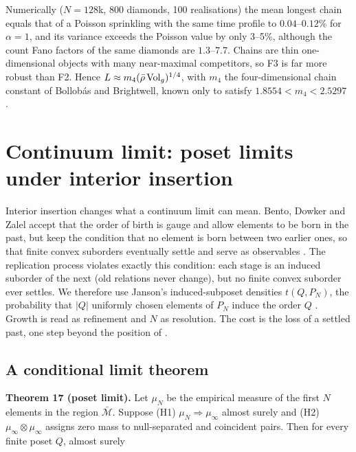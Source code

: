 Numerically (\(N=128\)k, 800 diamonds, 100 realisations) the
mean longest chain equals that of a Poisson sprinkling with
the same time profile to \(0.04\)--\(0.12\%\) for
\(\alpha=1\), and its variance exceeds the Poisson value by
only 3--5\%, although the count Fano factors of the same
diamonds are \(1.3\)--\(7.7\). Chains are thin
one-dimensional objects with many near-maximal competitors,
so F3 is far more robust than F2. Hence
\(L\approx m_4(\bar\rho\,{\rm Vol}_g)^{1/4}\), with \(m_4\)
the four-dimensional chain constant of Bollobás and
Brightwell, known only to satisfy \(1.8554<m_4<2.5297\)
\cite{BB91, BG91, BL15}.

\hypertarget{continuum-limit-poset-limits-under-interior-insertion}{%
\section{Continuum limit: poset limits under interior
insertion}\label{continuum-limit-poset-limits-under-interior-insertion}}

Interior insertion changes what a continuum limit can mean.
Bento, Dowker and Zalel accept that the order of birth is
gauge and allow elements to be born in the past, but keep
the condition that no element is born between two earlier
ones, so that finite convex suborders eventually settle and
serve as observables \cite{BDZ21}. The replication process
violates exactly this condition: each stage is an induced
suborder of the next (old relations never change), but no
finite convex suborder ever settles. We therefore use
Janson's induced-subposet densities \(t(Q,P_N)\), the
probability that \(|Q|\) uniformly chosen elements of
\(P_N\) induce the order \(Q\) \cite{Janson11}. Growth is
read as refinement and \(N\) as resolution. The cost is the
loss of a settled past, one step beyond the position of
\cite{BDZ21}.

\hypertarget{a-conditional-limit-theorem}{%
\subsection{A conditional limit
theorem}\label{a-conditional-limit-theorem}}

\textbf{Theorem 17 (poset limit).} Let \(\mu_N\) be the
empirical measure of the first \(N\) elements in the region
\(\bar{\mathcal M}\). Suppose (H1)
\(\mu_N\Rightarrow\mu_\infty\) almost surely and (H2)
\(\mu_\infty\otimes\mu_\infty\) assigns zero mass to
null-separated and coincident pairs. Then for every finite
poset \(Q\), almost surely

